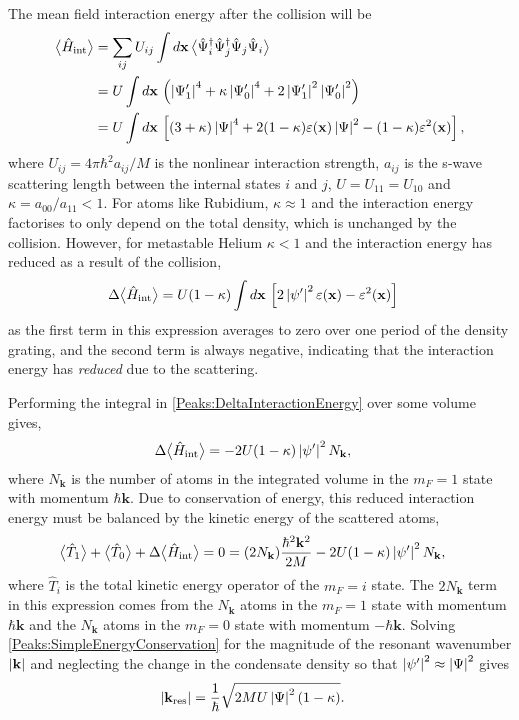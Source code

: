 The mean field interaction energy after the collision will be
\begin{align}
    \big<\hat{H}_\text{int}\big> &= \sum_{i j} U_{ij} \int d\mathbf{x}\, \big<\hat{\Psi}_i^\dagger \hat{\Psi}_j^\dagger \hat{\Psi}_j \hat{\Psi}_i\big>\\
                              &= U \int d\mathbf{x}\, \left(\left|\Psi_1'\right|^4 + \kappa \left|\Psi_0'\right|^4 + 2 \left|\Psi_1'\right|^2\left|\Psi_0'\right|^2\right) \\
                              &= U \int d\mathbf{x}\, \left[ (3+\kappa)\left|\Psi\right|^4 + 2 (1 - \kappa) \varepsilon(\mathbf{x}) \left|\Psi\right|^2 - (1 - \kappa) \varepsilon^2(\mathbf{x})\right],
\end{align}
where $U_{i j} = 4 \pi \hbar^2 a_{i j}/M$ is the nonlinear interaction strength, $a_{i j}$ is the s-wave scattering length between the internal states $i$ and $j$, $U=U_{1 1} = U_{1 0}$ and $\kappa = a_{0 0}/a_{1 1} < 1$. For atoms like Rubidium, $\kappa \approx 1$ and the interaction energy factorises to only depend on the total density, which is unchanged by the collision. However, for metastable Helium $\kappa < 1$ and the interaction energy has reduced as a result of the collision,
\begin{align}
    \Delta\mean{\hat{H}_\text{int}} &= U (1-\kappa) \int d\mathbf{x}\, \left[2 \abs{\psi'}^2\varepsilon(\mathbf{x}) - \varepsilon^2(\mathbf{x})\right] \label{Peaks:DeltaInteractionEnergy}
\end{align}
as the first term in this expression averages to zero over one period of the density grating, and the second term is always negative, indicating that the interaction energy has \emph{reduced} due to the scattering. 

Performing the integral in \eqref{Peaks:DeltaInteractionEnergy} over some volume gives,
\begin{align}
    \Delta \big<\hat{H}_\text{int}\big> &= -2 U (1-\kappa) \left|\psi'\right|^2 N_\mathbf{k},
\end{align}
where $N_\mathbf{k}$ is the number of atoms in the integrated volume in the $m_F=1$ state with momentum $\hbar \mathbf{k}$. Due to conservation of energy, this reduced interaction energy must be balanced by the kinetic energy of the scattered atoms,
\begin{align}
    \mean{\hat{T}_1} + \mean{\hat{T}_0} + \Delta \mean{\hat{H}_\text{int}} &= 0 = (2 N_\mathbf{k}) \frac{\hbar^2 \mathbf{k}^2}{2 M} -2 U (1-\kappa) \abs{\psi'}^2 N_\mathbf{k}, \label{Peaks:SimpleEnergyConservation}
\end{align}
where $\hat{T}_i$ is the total kinetic energy operator of the $m_F=i$ state. The $2 N_\mathbf{k}$ term in this expression comes from the $N_\mathbf{k}$ atoms in the $m_F=1$ state with momentum $\hbar \mathbf{k}$ and the $N_\mathbf{k}$ atoms in the $m_F=0$ state with momentum $-\hbar \mathbf{k}$. Solving \eqref{Peaks:SimpleEnergyConservation} for the magnitude of the resonant wavenumber $\left|\mathbf{k}\right|$ and neglecting the change in the condensate density so that $\left|\psi'\right|^2\approx \left|\Psi\right|^2$ gives
\begin{align}
    \left|\mathbf{k}_\text{res}\right| &= \frac{1}{\hbar}\sqrt{2MU\left|\Psi\right|^2\left(1-\kappa\right)}.
\end{align}


